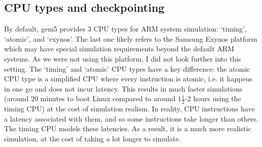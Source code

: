     \subsection{CPU types and checkpointing}
    By default, gem5 provides 3 CPU types for ARM system simulation: `timing',
    `atomic', and `exynos'. The last one likely refers to the Samsung Exynos 
    platform which may have special simulation requirements beyond the default 
    ARM systems. As we were not using this platform, I did not look further 
    into this setting. The `timing' and `atomic' CPU types have a key 
    difference: the atomic CPU type is a simplified CPU where every instruction 
    is atomic, i.e. it happens in one go and does not incur latency. This 
    results in much faster simulations (around 20 minutes to boot Linux 
    compared to around $1\frac{1}{2}$-2 hours using the timing CPU) at the cost 
    of 
    simulation realism. In reality, CPU instructions have a latency associated 
    with them, and so some instructions take longer than others. The timing CPU 
    models these latencies. As a result, it is a much more realistic simulation,
    at the cost of taking a lot longer to simulate.
    

